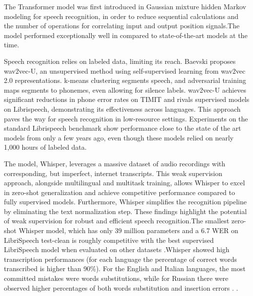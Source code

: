 The Transformer model was first introduced in Gaussian mixture hidden Markov modeling for speech recognition\cite{1198704}, in order to reduce sequential calculations and the number of operations for correlating input and output position signals\cite{orken2022study}.The model performed exceptionally well in compared to state-of-the-art models at the time.

Speech recognition relies on labeled data, limiting its reach. Baevski \cite{baevski2021unsupervised} proposes wav2vec-U, an unsupervised method using self-supervised learning from wav2vec 2.0 representations. k-means clustering segments speech, and adversarial training maps segments to phonemes, even allowing for silence labels. wav2vec-U achieves significant reductions in phone error rates on TIMIT and rivals supervised models on Librispeech, demonstrating its effectiveness across languages. This approach paves the way for speech recognition in low-resource settings. Experiments on the standard Librispeech benchmark show performance close to the state of the art models from only a few years ago, even though these models relied on nearly 1,000 hours of labeled data\cite{baevski2021unsupervised}. \newline

The model, Whisper, leverages a massive dataset of audio recordings with corresponding, but imperfect, internet transcripts. This weak supervision approach, alongside multilingual and multitask training, allows Whisper to excel in zero-shot generalization and achieve competitive performance compared to fully supervised models. Furthermore, Whisper simplifies the recognition pipeline by eliminating the text normalization step. These findings highlight the potential of weak supervision for robust and efficient speech recognition.The smallest zero-shot Whisper model, which has only 39 million parameters and a 6.7 WER on LibriSpeech test-clean is roughly competitive with the best supervised LibriSpeech model when evaluated on other datasets \cite{whisper}.Whisper showed high transcription performances (for each language the percentage of correct words transcribed is higher than 90\%). For the English and Italian languages, the most committed mistakes were words substitutions, while for Russian there were observed higher percentages of both words substitution and insertion errors \cite{amorese2023automatic}. \newline.